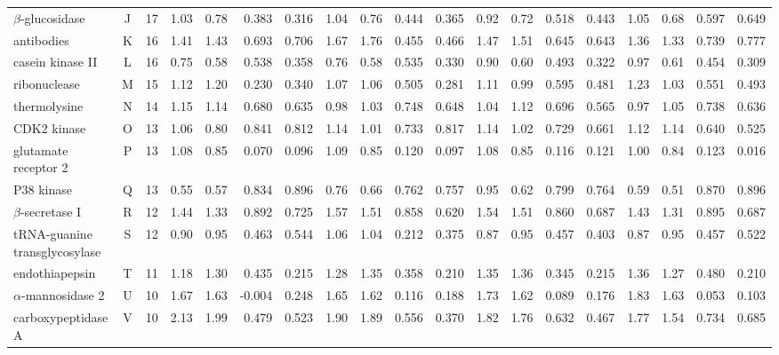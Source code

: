 \documentclass[linenumbers]{bmcart}
\begin{document}
\begin{backmatter}
\begin{sidewaystable}[ht]
\begin{tabular}{lcrrrrrrrrrrrrrrrrr}
$\beta$-glucosidase            & J &  17 & 1.03 & 0.78 & 0.383 & 0.316 & 1.04 & 0.76 & 0.444 & 0.365 & 0.92 & 0.72 & 0.518 & 0.443 & 1.05 & 0.68 & 0.597 & 0.649\\
antibodies                     & K &  16 & 1.41 & 1.43 & 0.693 & 0.706 & 1.67 & 1.76 & 0.455 & 0.466 & 1.47 & 1.51 & 0.645 & 0.643 & 1.36 & 1.33 & 0.739 & 0.777\\
casein kinase II               & L &  16 & 0.75 & 0.58 & 0.538 & 0.358 & 0.76 & 0.58 & 0.535 & 0.330 & 0.90 & 0.60 & 0.493 & 0.322 & 0.97 & 0.61 & 0.454 & 0.309\\
ribonuclease                   & M &  15 & 1.12 & 1.20 & 0.230 & 0.340 & 1.07 & 1.06 & 0.505 & 0.281 & 1.11 & 0.99 & 0.595 & 0.481 & 1.23 & 1.03 & 0.551 & 0.493\\
thermolysine                   & N &  14 & 1.15 & 1.14 & 0.680 & 0.635 & 0.98 & 1.03 & 0.748 & 0.648 & 1.04 & 1.12 & 0.696 & 0.565 & 0.97 & 1.05 & 0.738 & 0.636\\
CDK2 kinase                    & O &  13 & 1.06 & 0.80 & 0.841 & 0.812 & 1.14 & 1.01 & 0.733 & 0.817 & 1.14 & 1.02 & 0.729 & 0.661 & 1.12 & 1.14 & 0.640 & 0.525\\
glutamate receptor 2           & P &  13 & 1.08 & 0.85 & 0.070 & 0.096 & 1.09 & 0.85 & 0.120 & 0.097 & 1.08 & 0.85 & 0.116 & 0.121 & 1.00 & 0.84 & 0.123 & 0.016\\
P38 kinase                     & Q &  13 & 0.55 & 0.57 & 0.834 & 0.896 & 0.76 & 0.66 & 0.762 & 0.757 & 0.95 & 0.62 & 0.799 & 0.764 & 0.59 & 0.51 & 0.870 & 0.896\\
$\beta$-secretase I            & R &  12 & 1.44 & 1.33 & 0.892 & 0.725 & 1.57 & 1.51 & 0.858 & 0.620 & 1.54 & 1.51 & 0.860 & 0.687 & 1.43 & 1.31 & 0.895 & 0.687\\
tRNA-guanine transglycosylase  & S &  12 & 0.90 & 0.95 & 0.463 & 0.544 & 1.06 & 1.04 & 0.212 & 0.375 & 0.87 & 0.95 & 0.457 & 0.403 & 0.87 & 0.95 & 0.457 & 0.522\\
endothiapepsin                 & T &  11 & 1.18 & 1.30 & 0.435 & 0.215 & 1.28 & 1.35 & 0.358 & 0.210 & 1.35 & 1.36 & 0.345 & 0.215 & 1.36 & 1.27 & 0.480 & 0.210\\
$\alpha$-mannosidase 2         & U &  10 & 1.67 & 1.63 &-0.004 & 0.248 & 1.65 & 1.62 & 0.116 & 0.188 & 1.73 & 1.62 & 0.089 & 0.176 & 1.83 & 1.63 & 0.053 & 0.103\\
carboxypeptidase A             & V &  10 & 2.13 & 1.99 & 0.479 & 0.523 & 1.90 & 1.89 & 0.556 & 0.370 & 1.82 & 1.76 & 0.632 & 0.467 & 1.77 & 1.54 & 0.734 & 0.685\\

\end{tabular}
\end{sidewaystable}
\end{backmatter}
\end{document}
